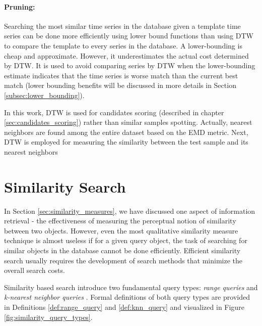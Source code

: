 \paragraph{Pruning:} Searching the most similar time series in the database given a template time series can be done more efficiently using lower bound functions than using DTW to compare the template to every series in the database. A lower-bounding is cheap and approximate. However, it underestimates the actual cost determined by DTW. It is used to avoid comparing series by DTW when the lower-bounding estimate indicates that the time series is worse match than the current best match \cite{rath2003word} (lower bounding benefits will be discussed in more details in Section \ref{subsec:lower_bounding}).

\iftoggle{edit-mode}{\hspace{0pt}\marginpar{How DTW is used in this work?}}{}
In this work, DTW is used for candidates scoring (described in chapter \ref{sec:candidates_scoring}) rather than similar samples spotting. Actually, nearest neighbors are found among the entire dataset based on the EMD metric. Next, DTW is employed for measuring the similarity between the test sample and its nearest neighbors


\newpage{}

\section{Similarity Search}
\label{sec:similarity_search}
 
\iftoggle{edit-mode}{\hspace{0pt}\marginpar{Introduction}}{}
In Section \ref{sec:similarity_measures}, we have discussed one aspect of information retrieval - the effectiveness of measuring the perceptual notion of similarity between two objects. However, even the most qualitative similarity measure technique is almost useless if for a given query object, the task of searching for similar objects in the database cannot be done efficiently. Efficient similarity search usually requires the development of search methods that minimize the overall search costs.

\iftoggle{edit-mode}{\hspace{0pt}\marginpar{Similarity search query types}}{}
Similarity based search introduce two fundamental query types: \emph{range queries} and \emph{k-nearest neighbor queries} \cite{hetland2009basic}. Formal definitions of both query types are provided in Definitions \ref{def:range_query} and \ref{def:knn_query} and visualized in Figure \ref{fig:similarity_query_types}.

